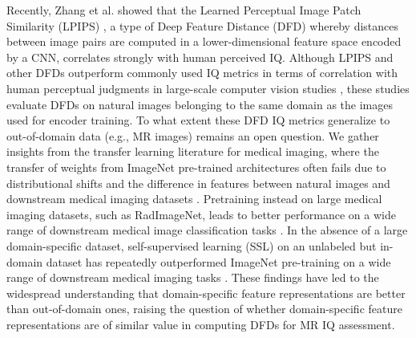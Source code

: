 \documentclass[AMA,STIX2COL,Linenumberson]{MRM}
\begin{document}
Recently, Zhang et al. showed that the Learned Perceptual Image Patch Similarity (LPIPS) \cite{zhang2018unreasonable}, a type of Deep Feature Distance (DFD) whereby distances between image pairs are computed in a lower-dimensional feature space encoded by a CNN, correlates strongly with human perceived IQ. Although LPIPS and other DFDs \cite{ding2020image, cong2022image, cheon2021perceptual, lao2022attentions, conde2022conformer, keshari2022multi} outperform commonly used IQ metrics in terms of correlation with human perceptual judgments in large-scale computer vision studies \cite{gu2022ntire}, these studies evaluate DFDs on natural images belonging to the same domain as the images used for encoder training. To what extent these DFD IQ metrics generalize to out-of-domain data (e.g., MR images) remains an open question. We gather insights from the transfer learning literature for medical imaging, where the transfer of weights from ImageNet \cite{deng2009imagenet} pre-trained architectures often fails due to distributional shifts and the difference in features between natural images and downstream medical imaging datasets \cite{raghu2019transfusion}. Pretraining instead on large medical imaging datasets, such as RadImageNet, leads to better performance on a wide range of downstream medical image classification tasks \cite{mei2022radimagenet, cadrin2022moving}. In the absence of a large domain-specific dataset, self-supervised learning (SSL) on an unlabeled but in-domain dataset has repeatedly outperformed ImageNet pre-training on a wide range of downstream medical imaging tasks \cite{huang2023self, cadrin2022moving}. These findings have led to the widespread understanding that domain-specific feature representations are better than out-of-domain ones, raising the question of whether domain-specific feature representations are of similar value in computing DFDs for MR IQ assessment. 
\end{document}
